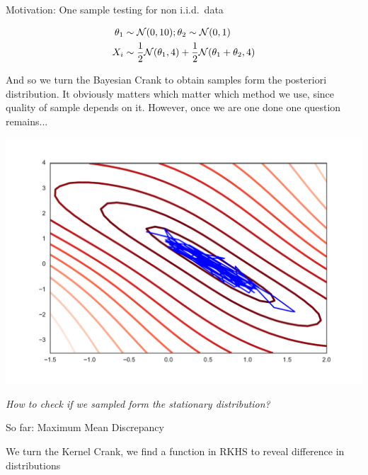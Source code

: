 


\begin{frame}
\begin{columns}
\begin{column}{.33\linewidth}
\begin{block}{Motivation: One sample testing for non i.i.d.\ data}
\begin{minipage}{.57\linewidth}

\begin{align*}
 \theta_{1}&\sim{\cal N}(0,10);\theta_{2}\sim{\cal N}(0,1) \\
 X_{i} &\sim\frac{1}{2}{\cal N}(\theta_{1},4)+\frac{1}{2}{\cal N}(\theta_{1}+\theta_{2},4)
\end{align*}
 \vspace{1cm} 

And so we turn the Bayesian Crank  to  obtain samples form the posteriori distribution. It obviously matters which matter which method we use, since quality of sample depends on it. However, once we are one  done one question remains...  
\end{minipage}
\begin{minipage}{.37\linewidth}
\includegraphics[scale=0.8]{../../presentation/img/sgld_trace_and_density.pdf}
\end{minipage}
\vspace{1cm}
\begin{center}
\Large
\emph{How to check if we sampled form the stationary distribution?}
\end{center}
\end{block}
\vspace{-0.75cm}
\begin{block}{So far: Maximum Mean Discrepancy}
\begin{center}We turn the Kernel Crank, we find a function in RKHS to reveal difference in distributions\end{center}
\begin{minipage}{.60\linewidth}



\end{minipage}
\end{block}
\end{column}
\end{columns}
\end{frame}
